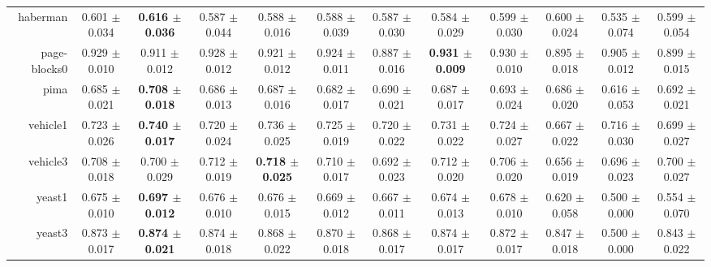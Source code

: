 \begin{table}[!ht]
{\begin{tabular}{r c c c c c c c c c c c}
haberman & 0.601 $\pm$ 0.034 & \textbf{0.616 $\pm$ 0.036} & 0.587 $\pm$ 0.044 & 0.588 $\pm$ 0.016 & 0.588 $\pm$ 0.039 & 0.587 $\pm$ 0.030 & 0.584 $\pm$ 0.029 & 0.599 $\pm$ 0.030 & 0.600 $\pm$ 0.024 & 0.535 $\pm$ 0.074 & 0.599 $\pm$ 0.054 \\
page-blocks0 & 0.929 $\pm$ 0.010 & 0.911 $\pm$ 0.012 & 0.928 $\pm$ 0.012 & 0.921 $\pm$ 0.012 & 0.924 $\pm$ 0.011 & 0.887 $\pm$ 0.016 & \textbf{0.931 $\pm$ 0.009} & 0.930 $\pm$ 0.010 & 0.895 $\pm$ 0.018 & 0.905 $\pm$ 0.012 & 0.899 $\pm$ 0.015 \\
pima & 0.685 $\pm$ 0.021 & \textbf{0.708 $\pm$ 0.018} & 0.686 $\pm$ 0.013 & 0.687 $\pm$ 0.016 & 0.682 $\pm$ 0.017 & 0.690 $\pm$ 0.021 & 0.687 $\pm$ 0.017 & 0.693 $\pm$ 0.024 & 0.686 $\pm$ 0.020 & 0.616 $\pm$ 0.053 & 0.692 $\pm$ 0.021 \\
vehicle1 & 0.723 $\pm$ 0.026 & \textbf{0.740 $\pm$ 0.017} & 0.720 $\pm$ 0.024 & 0.736 $\pm$ 0.025 & 0.725 $\pm$ 0.019 & 0.720 $\pm$ 0.022 & 0.731 $\pm$ 0.022 & 0.724 $\pm$ 0.027 & 0.667 $\pm$ 0.022 & 0.716 $\pm$ 0.030 & 0.699 $\pm$ 0.027 \\
vehicle3 & 0.708 $\pm$ 0.018 & 0.700 $\pm$ 0.029 & 0.712 $\pm$ 0.019 & \textbf{0.718 $\pm$ 0.025} & 0.710 $\pm$ 0.017 & 0.692 $\pm$ 0.023 & 0.712 $\pm$ 0.020 & 0.706 $\pm$ 0.020 & 0.656 $\pm$ 0.019 & 0.696 $\pm$ 0.023 & 0.700 $\pm$ 0.027 \\
yeast1 & 0.675 $\pm$ 0.010 & \textbf{0.697 $\pm$ 0.012} & 0.676 $\pm$ 0.010 & 0.676 $\pm$ 0.015 & 0.669 $\pm$ 0.012 & 0.667 $\pm$ 0.011 & 0.674 $\pm$ 0.013 & 0.678 $\pm$ 0.010 & 0.620 $\pm$ 0.058 & 0.500 $\pm$ 0.000 & 0.554 $\pm$ 0.070 \\
yeast3 & 0.873 $\pm$ 0.017 & \textbf{0.874 $\pm$ 0.021} & 0.874 $\pm$ 0.018 & 0.868 $\pm$ 0.022 & 0.870 $\pm$ 0.018 & 0.868 $\pm$ 0.017 & 0.874 $\pm$ 0.017 & 0.872 $\pm$ 0.017 & 0.847 $\pm$ 0.018 & 0.500 $\pm$ 0.000 & 0.843 $\pm$ 0.022 \\
\end{tabular}}
\end{table}
